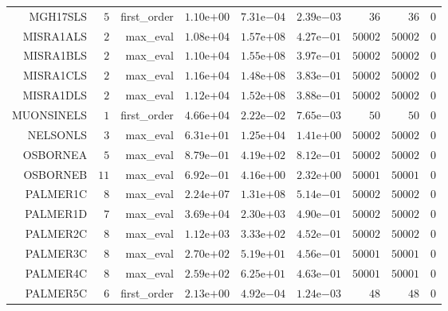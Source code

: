 \begin{longtable}{rrrrrrrrr}
MGH17SLS & \(     5\) & first\_order & \( 1.10\)e\(+00\) & \( 7.31\)e\(-04\) & \( 2.39\)e\(-03\) & \(    36\) & \(    36\) & \(     0\) \\
MISRA1ALS & \(     2\) & max\_eval & \( 1.08\)e\(+04\) & \( 1.57\)e\(+08\) & \( 4.27\)e\(-01\) & \( 50002\) & \( 50002\) & \(     0\) \\
MISRA1BLS & \(     2\) & max\_eval & \( 1.10\)e\(+04\) & \( 1.55\)e\(+08\) & \( 3.97\)e\(-01\) & \( 50002\) & \( 50002\) & \(     0\) \\
MISRA1CLS & \(     2\) & max\_eval & \( 1.16\)e\(+04\) & \( 1.48\)e\(+08\) & \( 3.83\)e\(-01\) & \( 50002\) & \( 50002\) & \(     0\) \\
MISRA1DLS & \(     2\) & max\_eval & \( 1.12\)e\(+04\) & \( 1.52\)e\(+08\) & \( 3.88\)e\(-01\) & \( 50002\) & \( 50002\) & \(     0\) \\
MUONSINELS & \(     1\) & first\_order & \( 4.66\)e\(+04\) & \( 2.22\)e\(-02\) & \( 7.65\)e\(-03\) & \(    50\) & \(    50\) & \(     0\) \\
NELSONLS & \(     3\) & max\_eval & \( 6.31\)e\(+01\) & \( 1.25\)e\(+04\) & \( 1.41\)e\(+00\) & \( 50002\) & \( 50002\) & \(     0\) \\
OSBORNEA & \(     5\) & max\_eval & \( 8.79\)e\(-01\) & \( 4.19\)e\(+02\) & \( 8.12\)e\(-01\) & \( 50002\) & \( 50002\) & \(     0\) \\
OSBORNEB & \(    11\) & max\_eval & \( 6.92\)e\(-01\) & \( 4.16\)e\(+00\) & \( 2.32\)e\(+00\) & \( 50001\) & \( 50001\) & \(     0\) \\
PALMER1C & \(     8\) & max\_eval & \( 2.24\)e\(+07\) & \( 1.31\)e\(+08\) & \( 5.14\)e\(-01\) & \( 50002\) & \( 50002\) & \(     0\) \\
PALMER1D & \(     7\) & max\_eval & \( 3.69\)e\(+04\) & \( 2.30\)e\(+03\) & \( 4.90\)e\(-01\) & \( 50002\) & \( 50002\) & \(     0\) \\
PALMER2C & \(     8\) & max\_eval & \( 1.12\)e\(+03\) & \( 3.33\)e\(+02\) & \( 4.52\)e\(-01\) & \( 50002\) & \( 50002\) & \(     0\) \\
PALMER3C & \(     8\) & max\_eval & \( 2.70\)e\(+02\) & \( 5.19\)e\(+01\) & \( 4.56\)e\(-01\) & \( 50001\) & \( 50001\) & \(     0\) \\
PALMER4C & \(     8\) & max\_eval & \( 2.59\)e\(+02\) & \( 6.25\)e\(+01\) & \( 4.63\)e\(-01\) & \( 50001\) & \( 50001\) & \(     0\) \\
PALMER5C & \(     6\) & first\_order & \( 2.13\)e\(+00\) & \( 4.92\)e\(-04\) & \( 1.24\)e\(-03\) & \(    48\) & \(    48\) & \(     0\) \\

\end{longtable}
